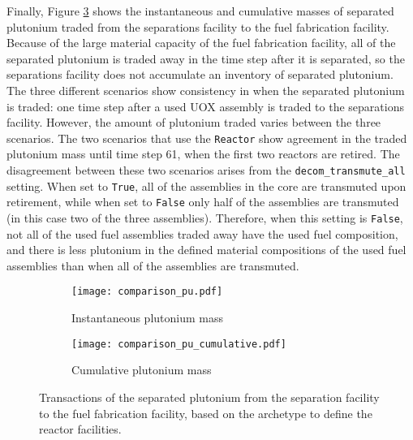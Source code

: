 Finally, Figure \ref{fig:comparison_pu} shows the instantaneous and cumulative 
masses of separated plutonium traded from the separations facility to 
the fuel fabrication facility. Because of the large material capacity of 
the fuel fabrication facility, all of the separated plutonium is traded 
away in the time step after it is separated, so the separations facility does 
not accumulate an inventory of separated plutonium. The three different 
scenarios show consistency
in when the separated plutonium is traded: one time step after a used
\gls{UOX} assembly is traded to the separations facility. However, the 
amount of plutonium traded varies between the three scenarios. The two 
scenarios that use the \Cycamore \texttt{Reactor} show agreement in the 
traded plutonium mass until time step 61, when the first two reactors are
retired. The disagreement between these two scenarios arises from the 
\texttt{decom\_transmute\_all} setting. When set to \texttt{True}, 
all of the assemblies in the core are transmuted upon retirement, 
while when set to \texttt{False} only half of the assemblies are 
transmuted (in this case two of the three assemblies). Therefore, 
when this setting is \texttt{False}, not all of the 
used fuel assemblies traded away have the used fuel composition, and 
there is less plutonium in the defined material compositions 
of the used fuel assemblies than when all of the assemblies are transmuted. 

\begin{figure}[ht!]
    \centering
    \begin{subfigure}[b]{0.48\textwidth}
        \centering
        \texttt{[image: comparison\_pu.pdf]}
        \caption{Instantaneous plutonium mass}
        \label{fig:comparison_pu_inst}
    \end{subfigure}
    \hfill
    \begin{subfigure}[b]{0.48\textwidth}
        \centering
        \texttt{[image: comparison\_pu\_cumulative.pdf]}
        \caption{Cumulative plutonium mass}
        \label{fig:comparison_pu_cumulative}
    \end{subfigure}
       \caption{Transactions of the separated plutonium from the
       separation facility to the fuel fabrication facility, based 
       on the archetype to define the reactor facilities.}
       \label{fig:comparison_pu}
\end{figure}

